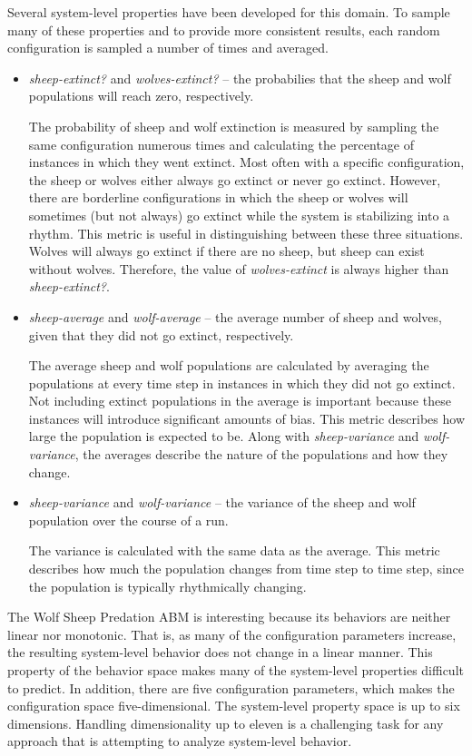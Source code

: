Several system-level properties have been developed for this domain.
To sample many of these properties and to provide more consistent results, each random configuration is sampled a number of times and averaged.
\begin{itemize}
\item \textit{sheep-extinct?} and \textit{wolves-extinct?} -- the probabilies that the sheep and wolf populations will reach zero, respectively.

The probability of sheep and wolf extinction is measured by sampling the same configuration numerous times and calculating the percentage of instances in which they went extinct.
Most often with a specific configuration, the sheep or wolves either always go extinct or never go extinct.
However, there are borderline configurations in which the sheep or wolves will sometimes (but not always) go extinct while the system is stabilizing into a rhythm.
This metric is useful in distinguishing between these three situations.
Wolves will always go extinct if there are no sheep, but sheep can exist without wolves.
Therefore, the value of \textit{wolves-extinct} is always higher than \textit{sheep-extinct?}.

\item \textit{sheep-average} and \textit{wolf-average} -- the average number of sheep and wolves, given that they did not go extinct, respectively.

The average sheep and wolf populations are calculated by averaging the populations at every time step in instances in which they did not go extinct.
Not including extinct populations in the average is important because these instances will introduce significant amounts of bias.
This metric describes how large the population is expected to be.
Along with \textit{sheep-variance} and \textit{wolf-variance}, the averages describe the nature of the populations and how they change.

\item \textit{sheep-variance} and \textit{wolf-variance} -- the variance of the sheep and wolf population over the course of a run.

The variance is calculated with the same data as the average.
This metric describes how much the population changes from time step to time step, since the population is typically rhythmically changing.

\end{itemize}

The Wolf Sheep Predation ABM is interesting because its behaviors are neither linear nor monotonic.
That is, as many of the configuration parameters increase, the resulting system-level behavior does not change in a linear manner.
This property of the behavior space makes many of the system-level properties difficult to predict.
In addition, there are five configuration parameters, which makes the configuration space five-dimensional.
The system-level property space is up to six dimensions.
Handling dimensionality up to eleven is a challenging task for any approach that is attempting to analyze system-level behavior.



